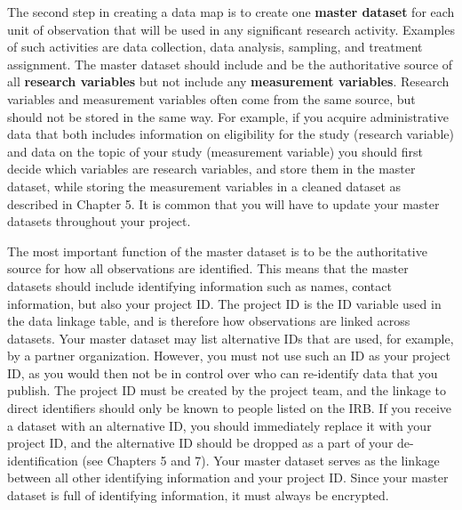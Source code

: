 The second step in creating a data map is to create one \textbf{master dataset}
for each unit of observation
that will be used in any significant research activity.
Examples of such activities are data collection, data analysis,
sampling, and treatment assignment.
The master dataset should include and be the authoritative source of
all \textbf{research variables}
but not include any \textbf{measurement variables}.
Research variables and measurement variables
often come from the same source,
but should not be stored in the same way.
For example, if you acquire administrative data that both includes
information on eligibility for the study (research variable)
and data on the topic of your study (measurement variable)
you should first decide which variables are research variables,
and store them in the master dataset,
while storing the measurement variables in a cleaned dataset
as described in Chapter 5.
It is common that you will have to update
your master datasets throughout your project.

The most important function of the master dataset
is to be the authoritative source
for how all observations are identified.
This means that the master datasets should include
identifying information such as names, contact information,
but also your project ID.
The project ID is the ID variable used in the data linkage table,
and is therefore how observations are linked across datasets.
Your master dataset may list alternative IDs that are used,
for example, by a partner organization.
However, you must not use such an ID as your project ID,
as you would then not be in control over
who can re-identify data that you publish.
The project ID must be created by the project team,
and the linkage to direct identifiers
should only be known to people listed on the IRB.
If you receive a dataset with an alternative ID,
you should immediately replace it with your project ID,
and the alternative ID should be dropped
as a part of your de-identification (see Chapters 5 and 7).
Your master dataset serves as the linkage between
all other identifying information and your project ID.
Since your master dataset is full of identifying information,
it must always be encrypted.

